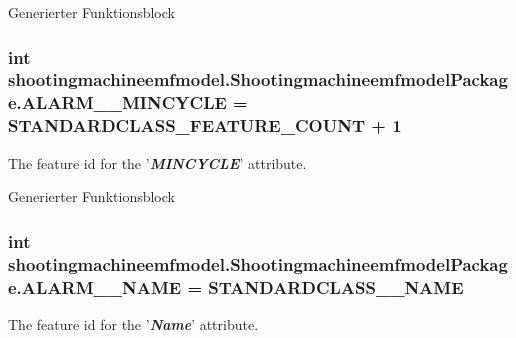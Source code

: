 Generierter Funktionsblock  \hypertarget{interfaceshootingmachineemfmodel_1_1_shootingmachineemfmodel_package_a3c7a7e962d5ba6ac8ce25359ed7838ef}{
\subsubsection[{A\-L\-A\-R\-M\-\_\-\-\_\-\-M\-I\-N\-C\-Y\-C\-L\-E}]{\setlength{\rightskip}{0pt plus 5cm}int shootingmachineemfmodel.\-Shootingmachineemfmodel\-Package.\-A\-L\-A\-R\-M\-\_\-\-\_\-\-M\-I\-N\-C\-Y\-C\-L\-E = {\bf S\-T\-A\-N\-D\-A\-R\-D\-C\-L\-A\-S\-S\-\_\-\-F\-E\-A\-T\-U\-R\-E\-\_\-\-C\-O\-U\-N\-T} + 1}}\label{interfaceshootingmachineemfmodel_1_1_shootingmachineemfmodel_package_a3c7a7e962d5ba6ac8ce25359ed7838ef}
The feature id for the '{\itshape {\bfseries M\-I\-N\-C\-Y\-C\-L\-E}}' attribute.

Generierter Funktionsblock  \hypertarget{interfaceshootingmachineemfmodel_1_1_shootingmachineemfmodel_package_a14df867c3b2b595f2fa93d35083e8097}{
\subsubsection[{A\-L\-A\-R\-M\-\_\-\-\_\-\-N\-A\-M\-E}]{\setlength{\rightskip}{0pt plus 5cm}int shootingmachineemfmodel.\-Shootingmachineemfmodel\-Package.\-A\-L\-A\-R\-M\-\_\-\-\_\-\-N\-A\-M\-E = {\bf S\-T\-A\-N\-D\-A\-R\-D\-C\-L\-A\-S\-S\-\_\-\-\_\-\-N\-A\-M\-E}}}\label{interfaceshootingmachineemfmodel_1_1_shootingmachineemfmodel_package_a14df867c3b2b595f2fa93d35083e8097}
The feature id for the '{\itshape {\bfseries Name}}' attribute.

